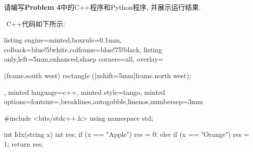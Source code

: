 \documentclass{article}
\begin{document}
\begin{homeworkProblem}
	请编写\textbf{Problem 4}中的C++程序和Python程序, 并展示运行结果.

	\solution \,\,C++代码如下所示:

\begin{tcblisting}{listing engine=minted,boxrule=0.1mm,
colback=blue!5!white,colframe=blue!75!black,
listing only,left=5mm,enhanced,sharp corners=all,
overlay={\begin{tcbclipinterior} (frame.south west)
rectangle ([xshift=5mm]frame.north west);\end{tcbclipinterior}},
minted language=c++,
minted style=tango,
minted options={fontsize=\small,breaklines,autogobble,linenos,numbersep=3mm}}
#include <bits/stdc++.h>
using namespace std;

int Idx(string x) {
    int res;
    if (x == "Apple") res = 0;
    else if (x == "Orange") res = 1;
    return res;
}


\end{tcblisting}
\end{homeworkProblem}
\end{document}
